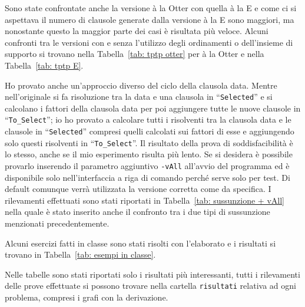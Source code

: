 \documentclass[a4paper,11pt]{article} %
\newcommand{\sintassi}{\texttt}
\newcommand{\file}{\texttt}
\newcommand{\campo}{\texttt}
\begin{document}
Sono state confrontate anche la versione à la Otter con quella à la E e
come ci si aspettava il numero di clausole generate dalla versione à la E
sono maggiori, ma nonostante questo la maggior parte dei casi
è risultata più veloce.
Alcuni confronti tra le versioni con e senza l'utilizzo degli ordinamenti
o dell'insieme di supporto
si trovano nella Tabella~\ref{tab: tptp otter} per à la Otter
e nella Tabella~\ref{tab: tptp E}.

Ho provato anche un'approccio diverso del ciclo della clausola data.
Mentre nell'originale si fa risoluzione tra la
data e una clausola in ``\campo{Selected}'' 
e si calcolano i fattori della clausola data
per poi aggiungere tutte le nuove clausole
in ``\campo{To\_Select}''; io ho provato a calcolare tutti i risolventi tra
la clausola data e le clausole in ``\campo{Selected}'' compresi quelli calcolati 
sui fattori di esse e aggiungendo solo questi risolventi in ``\campo{To\_Select}''.
Il risultato della prova di soddisfacibilità è lo stesso, anche se il mio esperimento
risulta più lento. Se si desidera è possibile provarlo inserendo
il parametro aggiuntivo \sintassi{-vAll} all'avvio del programma ed è 
disponibile solo nell'interfaccia a riga di comando perché serve solo per test.
Di default comunque verrà utilizzata la versione corretta come da specifica.
I rilevamenti effettuati sono stati riportati in Tabella~\ref{tab: sussunzione + vAll}
nella quale è stato inserito anche il confronto tra i due tipi di sussunzione
menzionati precedentemente.

Alcuni esercizi fatti in classe sono stati risolti con l'elaborato e i
risultati si trovano in Tabella~\ref{tab: esempi in classe}.

Nelle tabelle sono stati riportati solo i risultati più interessanti, 
tutti i rilevamenti delle prove effettuate si possono trovare nella 
cartella \file{risultati} relativa ad ogni problema, compresi i grafi
con la derivazione.

\end{document}
